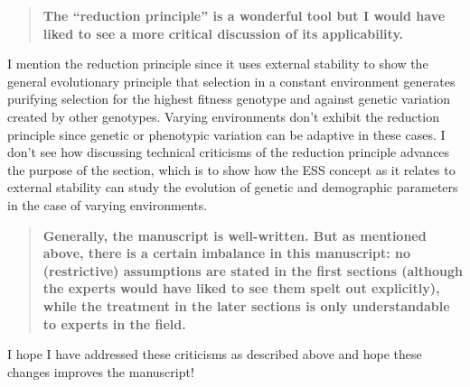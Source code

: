 \documentclass[10pt,parskip=full,foldmarks=off,addrfield=off,backaddress=false,refline=dateleft,letterpaper]{scrlttr2}
\newenvironment{reviewerquote}{\begin{quote}\color{DarkBlue}\bfseries}{\end{quote}}
\begin{document}
\begin{letter}
\begin{reviewerquote}
  The “reduction principle” is a wonderful tool but I would have liked to see a more critical discussion of its applicability.
\end{reviewerquote}

I mention the reduction principle since it uses external stability to show the general evolutionary principle that selection in a constant environment generates purifying selection for the highest fitness genotype and against genetic variation created by other genotypes. Varying environments don't exhibit the reduction principle since genetic or phenotypic variation can be adaptive in these cases. I don't see how discussing technical criticisms of the reduction principle advances the purpose of the section, which is to show how the ESS concept as it relates to external stability can study the evolution of genetic and demographic parameters in the case of varying environments.

\begin{reviewerquote}
Generally, the manuscript is well-written. But as mentioned above, there is a certain imbalance in this manuscript: no (restrictive) assumptions are stated in the first sections (although the experts would have liked to see them spelt out explicitly), while the treatment in the later sections is only understandable to experts in the field.
\end{reviewerquote}

I hope I have addressed these criticisms as described above and hope these changes improves the manuscript!

\end{letter}
\end{document}
